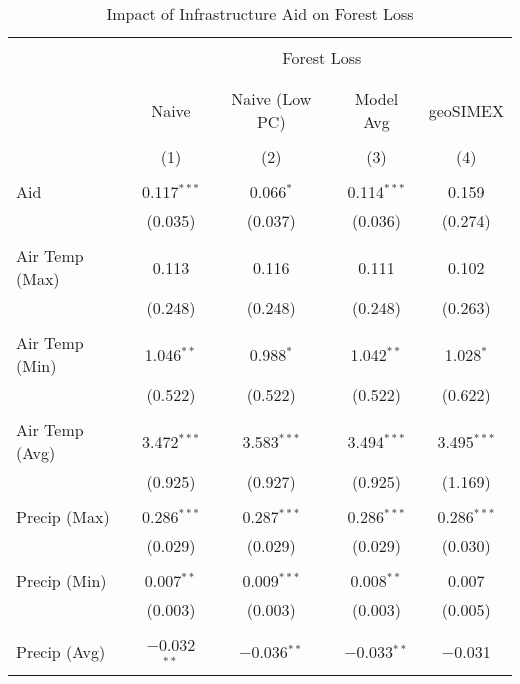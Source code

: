 
\begin{table}[!htbp] \centering 
  \caption{Impact of Infrastructure Aid on Forest Loss} 
  \label{} 
\begin{tabular}{@{\extracolsep{5pt}}lcccc} 
\\[-1.8ex]\hline 
\hline \\[-1.8ex] 
 & \multicolumn{4}{c}{Forest Loss} \\ 
\cline{2-5} 
\\[-1.8ex] & \multicolumn{4}{c}{} \\ 
 & Naive & Naive (Low PC) & Model Avg & geoSIMEX \\ 
\\[-1.8ex] & (1) & (2) & (3) & (4)\\ 
\hline \\[-1.8ex] 
 Aid & 0.117$^{***}$ & 0.066$^{*}$ & 0.114$^{***}$ & 0.159 \\ 
  & (0.035) & (0.037) & (0.036) & (0.274) \\ 
  & & & & \\ 
 Air Temp (Max) & 0.113 & 0.116 & 0.111 & 0.102 \\ 
  & (0.248) & (0.248) & (0.248) & (0.263) \\ 
  & & & & \\ 
 Air Temp (Min) & 1.046$^{**}$ & 0.988$^{*}$ & 1.042$^{**}$ & 1.028$^{*}$ \\ 
  & (0.522) & (0.522) & (0.522) & (0.622) \\ 
  & & & & \\ 
 Air Temp (Avg) & 3.472$^{***}$ & 3.583$^{***}$ & 3.494$^{***}$ & 3.495$^{***}$ \\ 
  & (0.925) & (0.927) & (0.925) & (1.169) \\ 
  & & & & \\ 
 Precip (Max) & 0.286$^{***}$ & 0.287$^{***}$ & 0.286$^{***}$ & 0.286$^{***}$ \\ 
  & (0.029) & (0.029) & (0.029) & (0.030) \\ 
  & & & & \\ 
 Precip  (Min) & 0.007$^{**}$ & 0.009$^{***}$ & 0.008$^{**}$ & 0.007 \\ 
  & (0.003) & (0.003) & (0.003) & (0.005) \\ 
  & & & & \\ 
 Precip  (Avg) & $-$0.032$^{**}$ & $-$0.036$^{**}$ & $-$0.033$^{**}$ & $-$0.031 \\ 

\end{tabular}
\end{table}
